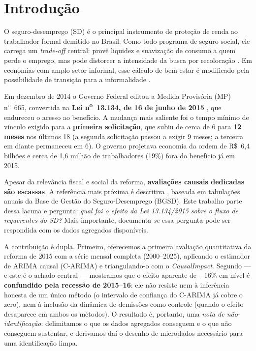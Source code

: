 \documentclass[12pt,a4paper]{article}
\begin{document}
\section{Introdução}

O seguro-desemprego (SD) é o principal instrumento de proteção de renda ao trabalhador formal demitido no Brasil. Como todo programa de seguro social, ele carrega um \textit{trade-off} central: provê liquidez e suavização de consumo a quem perde o emprego, mas pode distorcer a intensidade da busca por recolocação \citep{baily1978optimal,chetty2008moral}. Em economias com amplo setor informal, esse cálculo de bem-estar é modificado pela possibilidade de transição para a informalidade \citep{gerardgonzaga2021informal}.

Em dezembro de 2014 o Governo Federal editou a Medida Provisória (MP) n\textsuperscript{o}~665, convertida na \textbf{Lei n\textsuperscript{o}~13.134, de 16 de junho de 2015} \citep{lei13134_2015}, que endureceu o acesso ao benefício. A mudança mais saliente foi o tempo mínimo de vínculo exigido para a \textbf{primeira solicitação}, que subiu de cerca de 6 para \textbf{12 meses} nos últimos 18 (a segunda solicitação passou a exigir 9 meses; a terceira em diante permaneceu em 6). O governo projetava economia da ordem de R\$~6,4 bilhões e cerca de 1,6 milhão de trabalhadores (19\%) fora do benefício já em 2015.

Apesar da relevância fiscal e social da reforma, \textbf{avaliações causais dedicadas são escassas}. A referência mais próxima é descritiva \citep{amorim2024perfil}, baseada em tabulações anuais da Base de Gestão do Seguro-Desemprego (BGSD). Este trabalho parte dessa lacuna e pergunta: \textit{qual foi o efeito da Lei 13.134/2015 sobre o fluxo de requerentes do SD?} Mais importante, documenta \textit{se} essa pergunta pode ser respondida com os dados agregados disponíveis.

A contribuição é dupla. Primeiro, oferecemos a primeira avaliação quantitativa da reforma de 2015 com a série mensal completa (2000--2025), aplicando o estimador de ARIMA causal (C-ARIMA) e triangulando-o com o \textit{CausalImpact}. Segundo --- e este é o achado central --- mostramos que o efeito aparente de $-16\%$ em nível é \textbf{confundido pela recessão de 2015--16}: ele não resiste nem à inferência honesta de um único método (o intervalo de confiança do C-ARIMA já cobre o zero), nem à inclusão da dinâmica de demissões como controle (quando o efeito desaparece em ambos os métodos). O resultado é, portanto, uma \emph{nota de não-identificação}: delimitamos o que os dados agregados conseguem e o que não conseguem sustentar, e derivamos daí o desenho de microdados necessário para uma identificação limpa.
\end{document}

